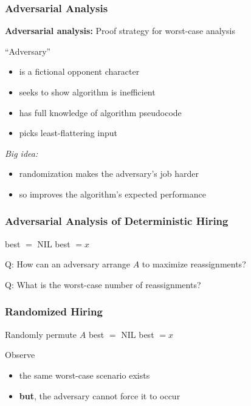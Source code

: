 \documentclass[10pt,aspectratio=169]{beamer}
\begin{document}
\begin{frame} \frametitle{Adversarial Analysis}
  \textbf{Adversarial analysis:} Proof strategy for worst-case analysis
  \vspace{12pt}

  ``Adversary''
  \begin{itemize}
    \item is a fictional opponent character
    \item seeks to show algorithm is inefficient
    \item has full knowledge of algorithm pseudocode
    \item picks least-flattering input
  \end{itemize}
  \vspace{12pt}

  \emph{Big idea:}
  \begin{itemize}
    \item randomization makes the adversary's job harder
    \item so improves the algorithm's expected performance
  \end{itemize}
\end{frame}

\begin{frame} \frametitle{Adversarial Analysis of Deterministic Hiring}
  {\footnotesize
  \begin{algorithmic}[1]
    \State best $ = $ NIL
        \State best $= x$
      \EndIf
    \EndFor
    \State {}
    \EndFunction
  \end{algorithmic}
  }
  \vspace{12pt}

  Q: How can an adversary arrange $A$ to maximize reassignments?
  \vspace{12pt}

  Q: What is the worst-case number of reassignments?
\end{frame}

\begin{frame} \frametitle{Randomized Hiring}
  {\footnotesize
  \begin{algorithmic}[1]
    \State Randomly permute $A$ 
    \State best $ = $ NIL
        \State best $= x$
      \EndIf
    \EndFor
    \State {}
    \EndFunction
  \end{algorithmic}
  }
  \vspace{12pt}

  Observe
  \begin{itemize}
    \item the same worst-case scenario exists
    \item \textbf{but}, the adversary cannot force it to occur
  \end{itemize}
\end{frame}
\end{document}
